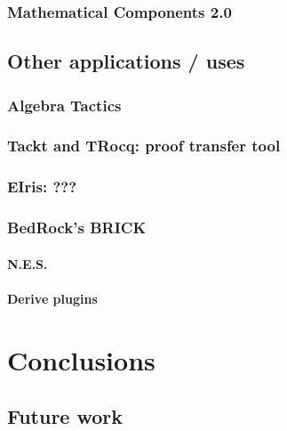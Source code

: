 \documentclass[a4paper, 11pt]{book}
\begin{document}
\subsection{Mathematical Components 2.0}

\section{Other applications / uses}
\subsection{Algebra Tactics}
\subsection{Tackt and TRocq: proof transfer tool}
\subsection{EIris: ???}
\subsection{BedRock's BRICK}
\subsubsection{N.E.S.}
\subsubsection{Derive plugins}


\chapter{Conclusions}
\section{Future work}
\nocite{*}
\printbibliography[title={Our Bibliography}, keyword=me]
\printbibliography[title={Bibliography}, keyword=they]
\end{document}
